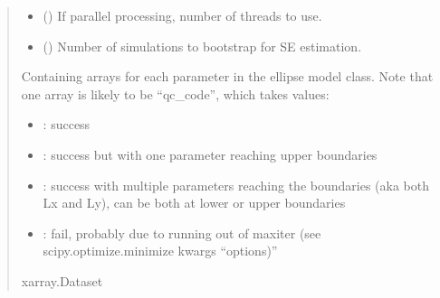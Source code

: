 \documentclass[letterpaper,10pt,english]{sphinxmanual}
\begin{document}
\begin{fulllineitems}
\begin{fulllineitems}
\begin{quote}
\begin{description}
\begin{itemize}
\item {}
\sphinxAtStartPar
{} () \textendash{} If parallel processing, number of threads to use.

\item {}
\sphinxAtStartPar
{} () \textendash{} Number of simulations to bootstrap for SE estimation.

\end{itemize}

\sphinxAtStartPar

\sphinxAtStartPar
{} \textendash{} Containing arrays for each parameter in the ellipse model class.
Note that one array is likely to be “qc\_code”, which takes values:
\begin{itemize}
\item {}
: success

\item {}
: success but with one parameter reaching upper
boundaries

\item {}
: success with multiple parameters reaching the
boundaries (aka both Lx and Ly), can be both at lower or
upper boundaries

\item {}
: fail, probably due to running out of maxiter (see
scipy.optimize.minimize kwargs “options)”

\end{itemize}


\sphinxAtStartPar
xarray.Dataset

\end{description}\end{quote}

\end{fulllineitems}



\end{fulllineitems}
\end{document}
